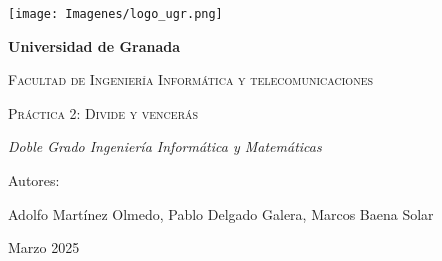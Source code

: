 \begin{titlepage}
	\centering

	\texttt{[image: Imagenes/logo\_ugr.png]} %
	\vspace{1cm} %

	{\bfseries\LARGE Universidad de Granada \par}
	\vspace{1cm}
	{\scshape\Large Facultad de Ingeniería Informática y telecomunicaciones \par}
	\vspace{3cm}
	{\scshape\Huge Práctica 2: Divide y vencerás \par}
	\vspace{3cm}
	{\itshape\Large Doble Grado Ingeniería Informática y Matemáticas \par}
	\vfill
	{\Large Autores: \par}
	{\Large Adolfo Martínez Olmedo, Pablo Delgado Galera, Marcos Baena Solar \par}
	\vfill
	{\Large Marzo 2025 \par}
\end{titlepage}
